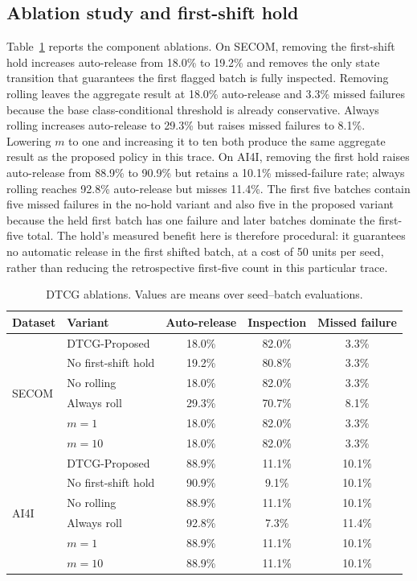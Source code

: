 \documentclass[journal]{IEEEtran}
\begin{document}
\subsection{Ablation study and first-shift hold}
Table~\ref{tab:ablation} reports the component ablations. On SECOM, removing the first-shift hold increases auto-release from 18.0\% to 19.2\% and removes the only state transition that guarantees the first flagged batch is fully inspected. Removing rolling leaves the aggregate result at 18.0\% auto-release and 3.3\% missed failures because the base class-conditional threshold is already conservative. Always rolling increases auto-release to 29.3\% but raises missed failures to 8.1\%. Lowering $m$ to one and increasing it to ten both produce the same aggregate result as the proposed policy in this trace. On AI4I, removing the first hold raises auto-release from 88.9\% to 90.9\% but retains a 10.1\% missed-failure rate; always rolling reaches 92.8\% auto-release but misses 11.4\%. The first five batches contain five missed failures in the no-hold variant and also five in the proposed variant because the held first batch has one failure and later batches dominate the first-five total. The hold's measured benefit here is therefore procedural: it guarantees no automatic release in the first shifted batch, at a cost of 50 units per seed, rather than reducing the retrospective first-five count in this particular trace.

\begin{table}[t]
\centering
\caption{DTCG ablations. Values are means over seed--batch evaluations.}
\label{tab:ablation}
\small
\begin{tabular}{llccc}
\toprule
Dataset & Variant & Auto-release & Inspection & Missed failure \\
\midrule
\multirow{6}{*}{SECOM}
& DTCG-Proposed & 18.0\% & 82.0\% & 3.3\% \\
& No first-shift hold & 19.2\% & 80.8\% & 3.3\% \\
& No rolling & 18.0\% & 82.0\% & 3.3\% \\
& Always roll & 29.3\% & 70.7\% & 8.1\% \\
& $m=1$ & 18.0\% & 82.0\% & 3.3\% \\
& $m=10$ & 18.0\% & 82.0\% & 3.3\% \\
\midrule
\multirow{6}{*}{AI4I}
& DTCG-Proposed & 88.9\% & 11.1\% & 10.1\% \\
& No first-shift hold & 90.9\% & 9.1\% & 10.1\% \\
& No rolling & 88.9\% & 11.1\% & 10.1\% \\
& Always roll & 92.8\% & 7.3\% & 11.4\% \\
& $m=1$ & 88.9\% & 11.1\% & 10.1\% \\
& $m=10$ & 88.9\% & 11.1\% & 10.1\% \\
\bottomrule
\end{tabular}
\end{table}
\end{document}
